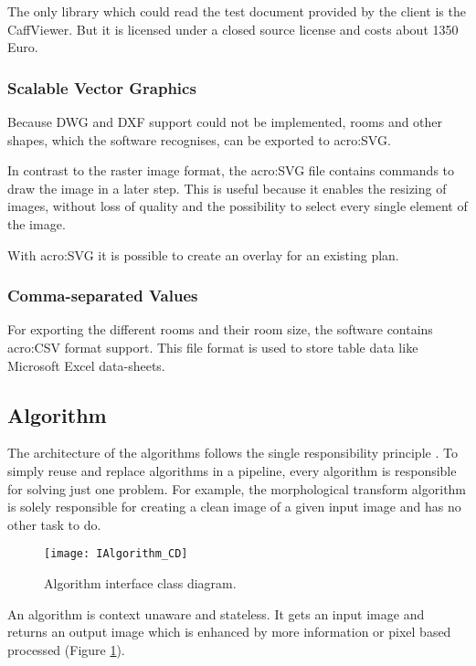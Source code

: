 The only library which could read the test document provided by the client is the CaffViewer. But it is licensed under a closed source license and costs about 1350 Euro.

\subsubsection{Scalable Vector Graphics}
Because DWG and DXF support could not be implemented, rooms and other shapes, which the software recognises, can be exported to \gls{acro:SVG}.

In contrast to the raster image format, the \gls{acro:SVG} file contains commands to draw the image in a later step. This is useful because it enables the resizing of images, without loss of quality and the possibility to select every single element of the image.

With \gls{acro:SVG} it is possible to create an overlay for an existing plan.

\subsubsection{Comma-separated Values}
For exporting the different rooms and their room size, the software contains \gls{acro:CSV} format support. This file format is used to store table data like Microsoft Excel data-sheets.

\subsection{Algorithm}
\label{sub:algorithm}
The architecture of the algorithms follows the single responsibility principle \citep[p.~484]{mclaughlin_pollice_west_2010}. To simply reuse and replace algorithms in a pipeline, every algorithm is responsible for solving just one problem. For example, the morphological transform algorithm is solely responsible for creating a clean image of a given input image and has no other task to do.

\begin{figure}[H]
  \centering
      \texttt{[image: IAlgorithm\_CD]}
  \caption{Algorithm interface class diagram.}
  \label{fig:IAlgorithm_CD}
\end{figure}

An algorithm is context unaware and stateless. It gets an input image and returns an output image which is enhanced by more information or pixel based processed (Figure \ref{fig:IAlgorithm_CD}).

